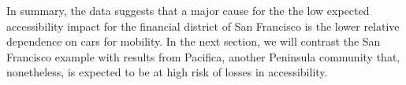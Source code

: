 In summary, the data suggests that a major cause for the the low expected accessibility impact for the financial district of San Francisco is the lower relative dependence on cars for mobility. In the next section, we will contrast the San Francisco example with results from Pacifica, another Peninsula community that, nonetheless, is expected to be at high risk of losses in accessibility.